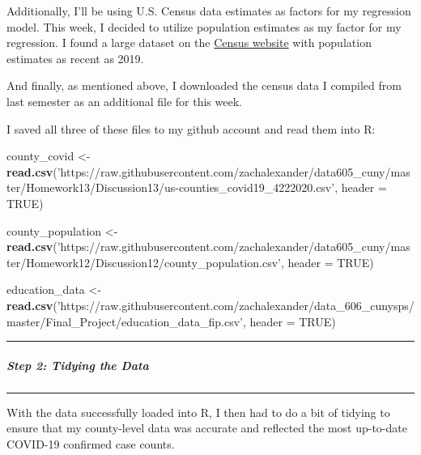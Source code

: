 \documentclass[
]{article}
\newenvironment{Shaded}{\begin{snugshade}}{\end{snugshade}}
\newcommand{\DataTypeTok}[1]{\textcolor[rgb]{0.13,0.29,0.53}{#1}}
\newcommand{\KeywordTok}[1]{\textcolor[rgb]{0.13,0.29,0.53}{\textbf{#1}}}
\newcommand{\NormalTok}[1]{#1}
\newcommand{\OtherTok}[1]{\textcolor[rgb]{0.56,0.35,0.01}{#1}}
\newcommand{\StringTok}[1]{\textcolor[rgb]{0.31,0.60,0.02}{#1}}
\begin{document}
Additionally, I'll be using U.S. Census data estimates as factors for my
regression model. This week, I decided to utilize population estimates
as my factor for my regression. I found a large dataset on the
\href{https://www.census.gov/data/datasets/time-series/demo/popest/2010s-counties-total.html\#par_textimage_70769902}{Census
website} with population estimates as recent as 2019.

And finally, as mentioned above, I downloaded the census data I compiled
from last semester as an additional file for this week.

I saved all three of these files to my github account and read them into
R:

\begin{Shaded}
\begin{Highlighting}[]
\NormalTok{county_covid <-}\StringTok{ }\KeywordTok{read.csv}\NormalTok{(}\StringTok{'https://raw.githubusercontent.com/zachalexander/data605_cuny/master/Homework13/Discussion13/us-counties_covid19_4222020.csv'}\NormalTok{, }\DataTypeTok{header =} \OtherTok{TRUE}\NormalTok{)}

\NormalTok{county_population <-}\StringTok{ }\KeywordTok{read.csv}\NormalTok{(}\StringTok{'https://raw.githubusercontent.com/zachalexander/data605_cuny/master/Homework12/Discussion12/county_population.csv'}\NormalTok{, }\DataTypeTok{header =} \OtherTok{TRUE}\NormalTok{)}

\NormalTok{education_data <-}\StringTok{ }\KeywordTok{read.csv}\NormalTok{(}\StringTok{'https://raw.githubusercontent.com/zachalexander/data_606_cunysps/master/Final_Project/education_data_fip.csv'}\NormalTok{, }\DataTypeTok{header =} \OtherTok{TRUE}\NormalTok{)}
\end{Highlighting}
\end{Shaded}

\begin{center}\rule{0.5\linewidth}{0.5pt}\end{center}

\hypertarget{step-2-tidying-the-data}{%
\subparagraph{Step 2: Tidying the Data}\label{step-2-tidying-the-data}}

\begin{center}\rule{0.5\linewidth}{0.5pt}\end{center}

With the data successfully loaded into R, I then had to do a bit of
tidying to ensure that my county-level data was accurate and reflected
the most up-to-date COVID-19 confirmed case counts.
\end{document}
